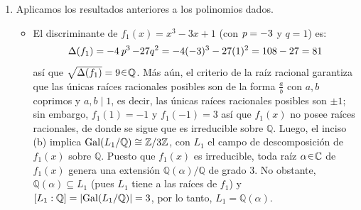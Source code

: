 \begin{sol}
\begin{enumerate}[label=\alph*)]
\item 
Aplicamos los resultados anteriores a los polinomios dados.
\begin{itemize}
    \item El discriminante de $f_1(x)=x^3-3x+1$ (con $\operatorname{\textit{p}}=-3$ y $q=1$) es:
    \[
    \Delta(f_1) = -4\operatorname{\textit{p}}^3-27q^2 = -4(-3)^3-27(1)^2 = 108-27=81
    \]
    así que $\sqrt{\Delta(f_1)} = 9 \en \mathbb{Q}$. Más aún, el criterio de la raíz racional garantiza que las únicas raíces racionales posibles son de la forma $\frac{a}{b}$ con $a,b$ coprimos y $a,b\mid1$, es decir, las únicas raíces racionales posibles son $\pm1$; sin embargo, $f_1(1)=-1$ y $f_1(-1)=3$ así que $f_1(x)$ no posee raíces racionales, de donde se sigue que es irreducible sobre $\mathbb{Q}$. Luego,
    el inciso (b) implica $\operatorname{Gal}(L_1/\mathbb{Q})\cong\mathbb{Z}/3\mathbb{Z}$, con $L_1$ el campo de descomposición de $f_1(x)$ sobre $\mathbb{Q}$. Puesto que $f_1(x)$ es irreducible, toda raíz $\alpha\en\mathbb{C}$ de $f_1(x)$ genera una extensión $\mathbb{Q}(\alpha)/\mathbb{Q}$ de grado $3$. No obstante, $\mathbb{Q}(\alpha) \subseteq L_1$ (pues $L_1$ tiene a las raíces de $f_1$) y $[L_1:\mathbb{Q}] = \abs{\operatorname{Gal}(L_1/\mathbb{Q})} = 3$, por lo tanto, $L_1 = \mathbb{Q}(\alpha)$.


\end{itemize}
\end{enumerate}
\end{sol}
